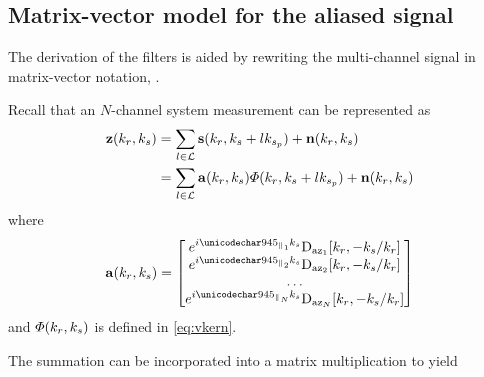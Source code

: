 \subsection{Matrix-vector model for the aliased signal}
The derivation of the filters is aided by rewriting the multi-channel signal in matrix-vector notation, \cite{Sikaneta2014}.
\par
Recall that an $N$-channel system measurement can be represented as
\begin{equation}
\begin{split}
 \mathbf{z}(k_r, k_{s}) &= \sum_{l\in\mathcal{L}}\mathbf{s}(k_r, k_{s} + lk_{s_p}) + \mathbf{n}(k_r, k_{s})\\
 &=\sum_{l\in\mathcal{L}}\mathbf{a}(k_r, k_{s})\varPhi(k_r, k_{s} + lk_{s_p}) + \mathbf{n}(k_r, k_{s})
\end{split}
\end{equation}
where
\begin{equation}
 \antennaVector(\kr, \kparm)=
 \begin{bmatrix}
  \eex{\im\alongtrackparm{1}\kparm}\dazPattern{1}[\kr, -\kparm/\kr]\\
  \eex{\im\alongtrackparm{2}\kparm}\dazPattern{2}[\kr, -\kparm/\kr]\\
  \ldots\\
  \eex{\im\alongtrackparm{N}\kparm}\dazPattern{N}[\kr, -\kparm/\kr]
 \end{bmatrix}
\end{equation}
and $\varPhi(k_r,k_{s})$ is defined in \eqref{eq:vkern}.
\par
The summation can be incorporated into a matrix multiplication to yield
\begin{center}
\end{center}

